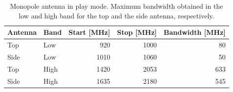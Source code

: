 \begin{table}[htbp]
    \centering
    \begin{tabular}{|l|l|r|r|r|}
      \hline
      Antenna & Band & Start [MHz] & Stop [MHz] & Bandwidth [MHz] \\
      \hline
      Top     & Low  & 920 & 1000 &  80 \\
      Side    & Low  & 1010 & 1060 & 50 \\
      \hline
      Top     & High & 1420 & 2053 & 633 \\
      Side    & High & 1635 & 2180 & 545 \\
      \hline
    \end{tabular}
    \caption{Monopole antenna in play mode. Maximum bandwidth obtained in the low and high band for the top and the side antenna, respectively.}    \label{tab:bw_sol1play}
  \end{table}

